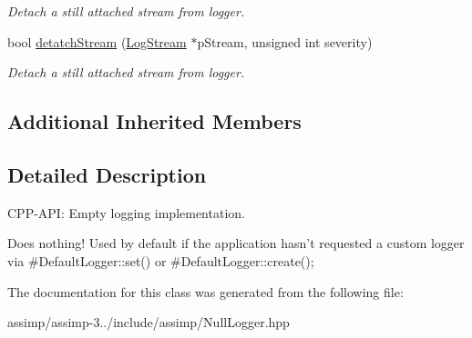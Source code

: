 \begin{DoxyCompactItemize}
\begin{DoxyCompactList}\small\item\em Detach a still attached stream from logger. \end{DoxyCompactList}\item 
\hypertarget{class_assimp_1_1_null_logger_ab49b14a0045aab73b813a448b5aa77b4}{bool \hyperlink{class_assimp_1_1_null_logger_ab49b14a0045aab73b813a448b5aa77b4}{detatch\+Stream} (\hyperlink{class_assimp_1_1_log_stream}{Log\+Stream} $\ast$p\+Stream, unsigned int severity)}\label{class_assimp_1_1_null_logger_ab49b14a0045aab73b813a448b5aa77b4}

\begin{DoxyCompactList}\small\item\em Detach a still attached stream from logger. \end{DoxyCompactList}\end{DoxyCompactItemize}
\subsection*{Additional Inherited Members}


\subsection{Detailed Description}
C\+P\+P-\/\+A\+P\+I\+: Empty logging implementation. 

Does nothing! Used by default if the application hasn't requested a custom logger via \#\+Default\+Logger\+::set() or \#\+Default\+Logger\+::create(); 

The documentation for this class was generated from the following file\+:\begin{DoxyCompactItemize}
\item 
assimp/assimp-\/3../include/assimp/Null\+Logger.\+hpp\end{DoxyCompactItemize}
